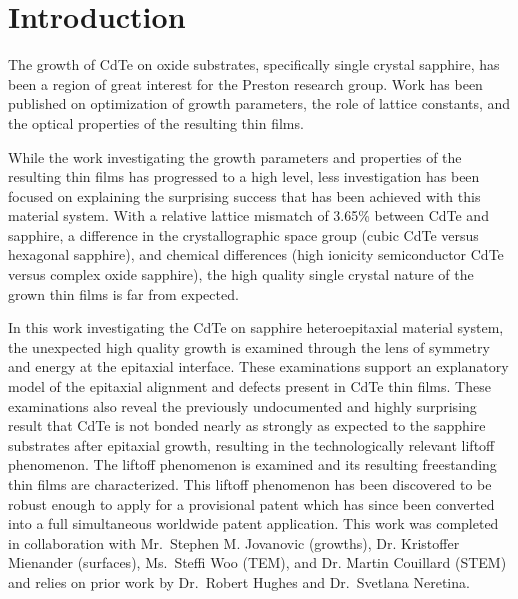 \section{Introduction}
The growth of CdTe on oxide substrates, specifically single crystal sapphire, has been a region of great interest for the Preston research group.
Work has been published on optimization of growth parameters, the role of lattice constants, and the optical properties of the resulting thin films\cite{Neretina2009a,Neretina2008b,Neretina2009b,Neretina2007,Neretina2006,cdte-optical}.

While the work investigating the growth parameters and properties of the resulting thin films has progressed to a high level, less investigation has been focused on explaining the surprising success that has been achieved with this material system.
With a relative lattice mismatch of 3.65\% between CdTe and sapphire, a difference in the 
crystallographic space group (cubic CdTe versus hexagonal sapphire), and chemical differences (high ionicity semiconductor CdTe versus complex oxide sapphire), the high quality single crystal nature of the grown thin films is far from expected.

In this work investigating the CdTe on sapphire heteroepitaxial material system, the unexpected high quality growth is examined through the lens of symmetry and energy at the epitaxial interface.
These examinations support an explanatory model of the epitaxial alignment and defects present in CdTe thin films.
These examinations also reveal the previously undocumented and highly surprising result that CdTe is not bonded nearly as strongly as expected to the sapphire substrates after epitaxial growth, resulting in the technologically relevant liftoff phenomenon.
The liftoff phenomenon is examined and its resulting freestanding thin films are characterized.
This liftoff phenomenon has been discovered to be robust enough to apply for a provisional patent\cite{patent} which has since been converted into a full simultaneous worldwide patent application.
This work was completed in collaboration with Mr.~Stephen M. Jovanovic (growths), Dr.
Kristoffer Mienander (surfaces), Ms.~Steffi Woo (TEM), and Dr. Martin Couillard (STEM) and relies on prior work by Dr.~Robert Hughes and Dr.~Svetlana Neretina.
